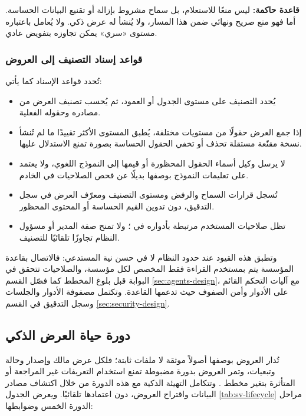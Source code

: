 \noindent\textbf{قاعدة حاكمة:}  ليس منعًا للاستعلام، بل سماح مشروط بإزالة أو تقنيع البيانات الحساسة. أما  فهو منع صريح ونهائي ضمن هذا المسار، ولا يُنشأ له عرض ذكي. ولا يُعامل  باعتباره مستوى «سري» يمكن تجاوزه بتفويض عادي.

\subsubsection{قواعد إسناد التصنيف إلى العروض}

تُحدد قواعد الإسناد كما يأتي:

\begin{itemize}[label=\textcolor{kauprimary}{$\blacktriangleright$},leftmargin=*]
  \item يُحدد التصنيف على مستوى الجدول أو العمود، ثم يُحسب تصنيف العرض من مصادره وحقوله الفعلية.
  \item إذا جمع العرض حقولًا من مستويات مختلفة، يُطبق المستوى الأكثر تقييدًا ما لم تُنشأ نسخة مقنّعة مستقلة تحذف أو تخفي الحقول الحساسة بصورة تمنع الاستدلال عليها.
  \item لا يرسل وكيل  أسماء الحقول المحظورة أو قيمها إلى النموذج اللغوي، ولا يعتمد على تعليمات النموذج بوصفها بديلًا عن فحص الصلاحيات في الخادم.
  \item تُسجل قرارات السماح والرفض ومستوى التصنيف ومعرّف العرض في سجل التدقيق، دون تدوين القيم الحساسة أو المحتوى المحظور.
  \item تظل صلاحيات المستخدم مرتبطة بأدواره في ؛ ولا تمنح صفة المدير أو مسؤول النظام تجاوزًا تلقائيًا للتصنيف.
\end{itemize}

وتطبق هذه القيود عند حدود النظام لا في حسن نية المستدعي: فالاتصال بقاعدة المؤسسة يتم بمستخدم القراءة فقط المخصص لكل مؤسسة، والصلاحيات تتحقق في البوابة قبل بلوغ المخطط كما فصّل القسم \ref{sec:agents-design}، مع آليات التحكم القائم على الأدوار وأمن الصفوف حيث تدعمها القاعدة. وتكتمل مصفوفة الأدوار والجلسات وسجل التدقيق في القسم \ref{sec:security-design}.

\subsection{دورة حياة العرض الذكي}
\label{subsec:sv-lifecycle}

تُدار العروض بوصفها أصولاً موثقة لا ملفات ثابتة؛ فلكل عرض مالك وإصدار وحالة وتبعيات، وتمر العروض بدورة مضبوطة تمنع استخدام التعريفات غير المراجعة أو المتأثرة بتغير مخطط . وتتكامل التهيئة الذكية مع هذه الدورة من خلال اكتشاف مصادر البيانات واقتراح العروض، دون اعتمادها تلقائيًا. ويعرض الجدول \ref{tab:sv-lifecycle} مراحل الدورة الخمس وضوابطها:

